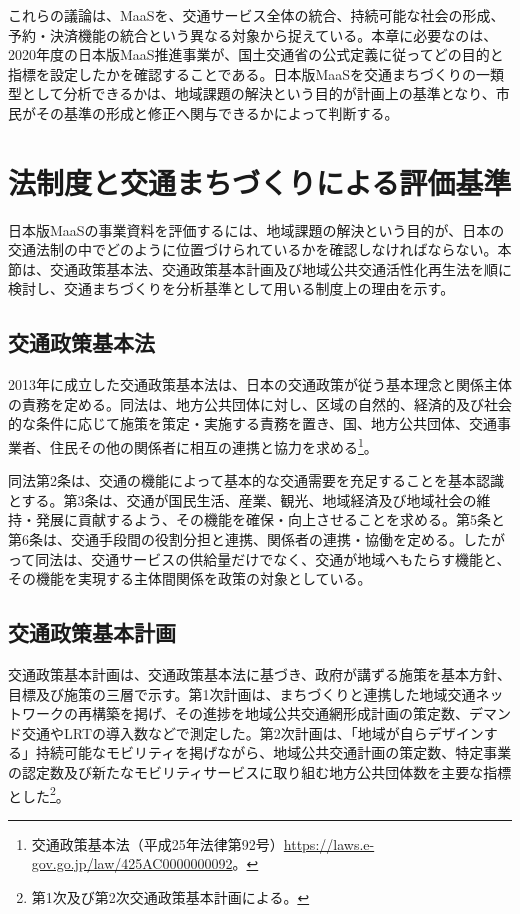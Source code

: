 これらの議論は、MaaSを、交通サービス全体の統合、持続可能な社会の形成、予約・決済機能の統合という異なる対象から捉えている。本章に必要なのは、2020年度の日本版MaaS推進事業が、国土交通省の公式定義に従ってどの目的と指標を設定したかを確認することである。日本版MaaSを交通まちづくりの一類型として分析できるかは、地域課題の解決という目的が計画上の基準となり、市民がその基準の形成と修正へ関与できるかによって判断する。

\section{法制度と交通まちづくりによる評価基準}
\label{sec:ch4_legal_framework}

日本版MaaSの事業資料を評価するには、地域課題の解決という目的が、日本の交通法制の中でどのように位置づけられているかを確認しなければならない。本節は、交通政策基本法、交通政策基本計画及び地域公共交通活性化再生法を順に検討し、交通まちづくりを分析基準として用いる制度上の理由を示す。

\subsection{交通政策基本法}
\label{subsec:ch4_basic_law}

2013年に成立した交通政策基本法は、日本の交通政策が従う基本理念と関係主体の責務を定める。同法は、地方公共団体に対し、区域の自然的、経済的及び社会的な条件に応じて施策を策定・実施する責務を置き、国、地方公共団体、交通事業者、住民その他の関係者に相互の連携と協力を求める\footnote{交通政策基本法（平成25年法律第92号）\url{https://laws.e-gov.go.jp/law/425AC0000000092}。}。

同法第2条は、交通の機能によって基本的な交通需要を充足することを基本認識とする。第3条は、交通が国民生活、産業、観光、地域経済及び地域社会の維持・発展に貢献するよう、その機能を確保・向上させることを求める。第5条と第6条は、交通手段間の役割分担と連携、関係者の連携・協働を定める。したがって同法は、交通サービスの供給量だけでなく、交通が地域へもたらす機能と、その機能を実現する主体間関係を政策の対象としている。

\subsection{交通政策基本計画}
\label{subsec:ch4_basic_plan}

交通政策基本計画は、交通政策基本法に基づき、政府が講ずる施策を基本方針、目標及び施策の三層で示す。第1次計画は、まちづくりと連携した地域交通ネットワークの再構築を掲げ、その進捗を地域公共交通網形成計画の策定数、デマンド交通やLRTの導入数などで測定した。第2次計画は、「地域が自らデザインする」持続可能なモビリティを掲げながら、地域公共交通計画の策定数、特定事業の認定数及び新たなモビリティサービスに取り組む地方公共団体数を主要な指標とした\footnote{第1次及び第2次交通政策基本計画による。}。

